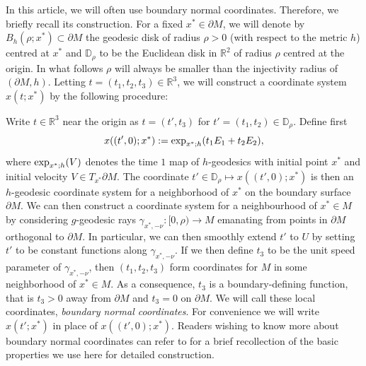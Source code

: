 \documentclass[12pt,a4paper]{amsart}
\numberwithin{equation}{section}
\theoremstyle{plain}
\theoremstyle{definition}
\newcommand{\R}{\mathbb{R}}
\newcommand{\D}{\mathbb{D}}
\begin{document}
	In this article, we will often use boundary normal coordinates. Therefore, we briefly recall its construction. For a fixed $x^*\in \partial M$, we will denote by $B_h(\rho;x^*) \subset \partial M$ the geodesic disk of radius $\rho>0$ (with respect to the metric $h$) centred at $x^*$ and $\D_\rho$ to be the Euclidean disk in $\R^2$ of radius $\rho$ centred at the origin. In what follows $\rho$ will always be smaller than the injectivity radius of $(\partial M, h)$. Letting $t = (t_1,t_2,t_3) \in \R^3$, we will construct a coordinate system $x(t; x^*)$ by the following procedure:
	
	Write $t\in \R^3$ near the origin as $t  = (t',t_3)$ for $t' = (t_1,t_2)\in \D_\rho$. Define first 
	$$x((t',0); x^*) := {\rm {exp}}_{x^*;h} (t_1 E_1+ t_2 E_2),$$
	where ${\rm{exp}}_{x^*;h} (V)$ denotes the time $1$ map of $h$-geodesics with initial point $x^*$ and initial velocity $V\in T_{x^*}\partial M$. The coordinate $t'\in \D_\rho \mapsto x((t',0); x^*)$ is then an $h$-geodesic coordinate system for a neighborhood of $x^*$ on the boundary surface $\partial M$. We can then construct a coordinate system for a neighbourhood of $x^*\in M$ by considering $g$-geodesic rays $\gamma_{x^*,-\nu}:[0,\rho)\rightarrow M$ emanating from points in $\partial M$ orthogonal to $\partial M$. In particular, we can then smoothly extend $t'$ to $U$ by setting $t'$ to be constant functions along $\gamma_{x^*,-\nu}$. If we then define $t_3$ to be the unit speed parameter of $\gamma_{x^*,-\nu}$, then $(t_1,t_2,t_3)$ form coordinates for $M$ in some neighborhood of $x^*\in M$. As a consequence, $t_3$ is a boundary-defining function, that is $t_3>0$ away from $\partial M$ and $t_3=0$ on $\partial M$. We will call these local coordinates, \textit{boundary normal coordinates}. For convenience we will write $x(t'; x^*)$ in place of $x((t',0);x^*)$. Readers wishing to know more about boundary normal coordinates can refer to \cite{lee} for a brief recollection of the basic properties we use here for detailed construction.  
	
\end{document}
